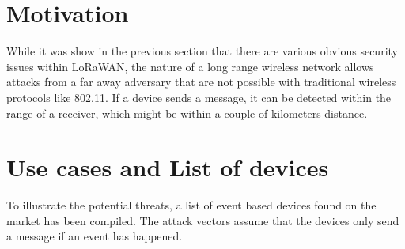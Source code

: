 \hypertarget{h.kyg6ihxrou88}{\section{\texorpdfstring{{Motivation}}{Motivation}}\label{h.kyg6ihxrou88}}

{While it was show in the previous section that there are various
obvious security issues within LoRaWAN, the nature of a long range
wireless network allows attacks from a far away adversary that are not
possible with traditional wireless protocols like 802.11. If a device
sends a message, it can be detected within the range of a receiver,
which might be within a couple of kilometers distance.}

\section{Use cases and
List of devices}\label{h.jsdk7si1wtbx}

{To illustrate the potential threats, a list of event based devices
found on the market has been compiled. The attack vectors assume that
the devices only send a message if an event has happened.}

